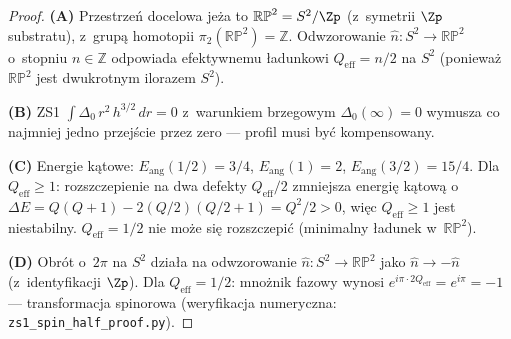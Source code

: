 \begin{proof}
\textbf{(A)} Przestrze\'n docelowa je\.za to
$\mathbb{RP}^2 = S^2/\Zp$ (z~symetrii $\Zp$ substratu),
z~grup\k{a} homotopii $\pi_2(\mathbb{RP}^2) = \mathbb{Z}$.
Odwzorowanie $\hat{n}\colon S^2 \to \mathbb{RP}^2$
o~stopniu $n \in \mathbb{Z}$ odpowiada efektywnemu
\l{}adunkowi $Q_{\mathrm{eff}} = n/2$ na $S^2$
(poniewa\.z $\mathbb{RP}^2$ jest dwukrotnym ilorazem $S^2$).

\textbf{(B)} ZS1 $\int\Delta_0\,r^2\,h^{3/2}\,dr = 0$
z~warunkiem brzegowym $\Delta_0(\infty) = 0$
wymusza co najmniej jedno przej\'scie przez zero ---
profil musi by\'c kompensowany.

\textbf{(C)} Energie k\k{a}towe: $E_{\mathrm{ang}}(1/2) = 3/4$,
$E_{\mathrm{ang}}(1) = 2$, $E_{\mathrm{ang}}(3/2) = 15/4$.
Dla $Q_{\mathrm{eff}} \geq 1$: rozszczepienie na dwa defekty
$Q_{\mathrm{eff}}/2$ zmniejsza energi\k{e} k\k{a}tow\k{a}
o~$\Delta E = Q(Q+1) - 2(Q/2)(Q/2+1) = Q^2/2 > 0$,
wi\k{e}c $Q_{\mathrm{eff}} \geq 1$ jest niestabilny.
$Q_{\mathrm{eff}} = 1/2$ nie mo\.ze si\k{e} rozszczepi\'c
(minimalny \l{}adunek w~$\mathbb{RP}^2$).

\textbf{(D)} Obr\'ot o~$2\pi$ na $S^2$ dzia\l{}a na
odwzorowanie $\hat{n}\colon S^2 \to \mathbb{RP}^2$
jako $\hat{n} \to -\hat{n}$ (z~identyfikacji $\Zp$).
Dla $Q_{\mathrm{eff}} = 1/2$: mno\.znik fazowy wynosi
$e^{i\pi \cdot 2Q_{\mathrm{eff}}} = e^{i\pi} = -1$ ---
transformacja spinorowa (weryfikacja numeryczna:
\texttt{zs1\_spin\_half\_proof.py}).
\end{proof}

